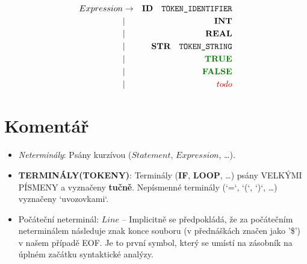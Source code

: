 \documentclass[a4paper,11pt,landscape,leqno]{article}
\begin{document}
\begin{eqnarray}
Expression &    \rightarrow    & \textbf{ID}\quad \textrm{\texttt{TOKEN\_IDENTIFIER}}  \\
        &   |       &   \textbf{INT}    \\
        &   |       &   \textbf{REAL}   \\
        &   |       &   \textbf{STR}\quad \textrm{\texttt{TOKEN\_STRING}} \\
        &   |       &   \textcolor{green1}{\textbf{TRUE}}    \\
        &   |       &   \textcolor{green1}{\textbf{FALSE}}    \\
        &   |       &   \textcolor{red1}{todo}
\end{eqnarray}

\section{Komentář}
\begin{itemize}
\item{\emph{Neterminály}: Psány kurzívou ($Statement$, $Expression$, \dots).}
\item{\textbf{TERMINÁLY(TOKENY)}: Terminály (\textbf{IF}, \textbf{LOOP}, \dots) psány VELKÝMI PÍSMENY a vyznačeny \textbf{tučně}. Nepísmenné terminály (`=`, `(`, `)`, \dots) vyznačeny `uvozovkami`.}
\item {Počáteční neterminál: $Line$} -- Implicitně se předpokládá, že za počátečním neterminálem následuje znak konce souboru (v přednáškách značen jako '\$') v našem případě EOF. Je to první symbol, který se umístí na zásobník na úplném začátku syntaktické analýzy.
\end{itemize}
\enddocument
\end{document}
